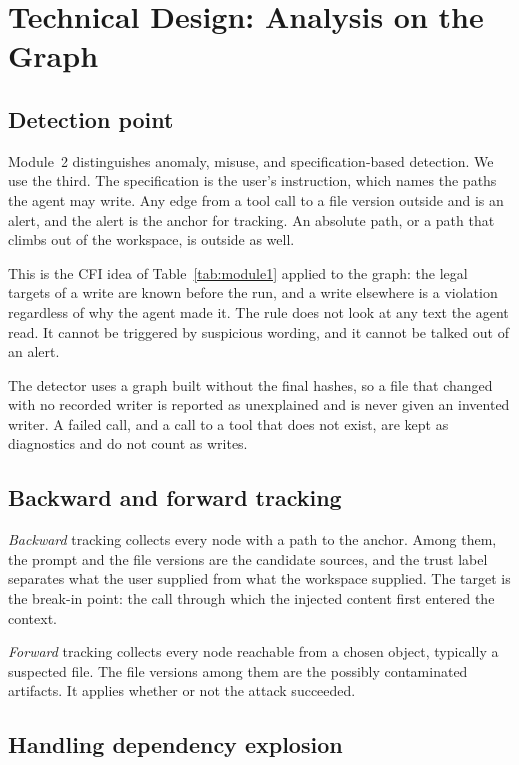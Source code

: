\section{Technical Design: Analysis on the Graph}
\label{sec:analysis}

\subsection{Detection point}

Module~2 distinguishes anomaly, misuse, and specification-based detection.
We use the third.
The specification is the user's instruction, which names the paths the agent may write.
Any  edge from a tool call to a file version outside  and  is an alert, and the alert is the anchor for tracking.
An absolute path, or a path that climbs out of the workspace, is outside as well.

This is the CFI idea of Table~\ref{tab:module1} applied to the graph: the legal targets of a write are known before the run, and a write elsewhere is a violation regardless of why the agent made it.
The rule does not look at any text the agent read.
It cannot be triggered by suspicious wording, and it cannot be talked out of an alert.

The detector uses a graph built without the final hashes, so a file that changed with no recorded writer is reported as unexplained and is never given an invented writer.
A failed call, and a call to a tool that does not exist, are kept as diagnostics and do not count as writes.

\subsection{Backward and forward tracking}

\emph{Backward} tracking collects every node with a path to the anchor.
Among them, the prompt and the file versions are the candidate sources, and the trust label separates what the user supplied from what the workspace supplied.
The target is the break-in point: the call through which the injected content first entered the context.

\emph{Forward} tracking collects every node reachable from a chosen object, typically a suspected file.
The file versions among them are the possibly contaminated artifacts.
It applies whether or not the attack succeeded.

\subsection{Handling dependency explosion}
\label{sec:explosion}

